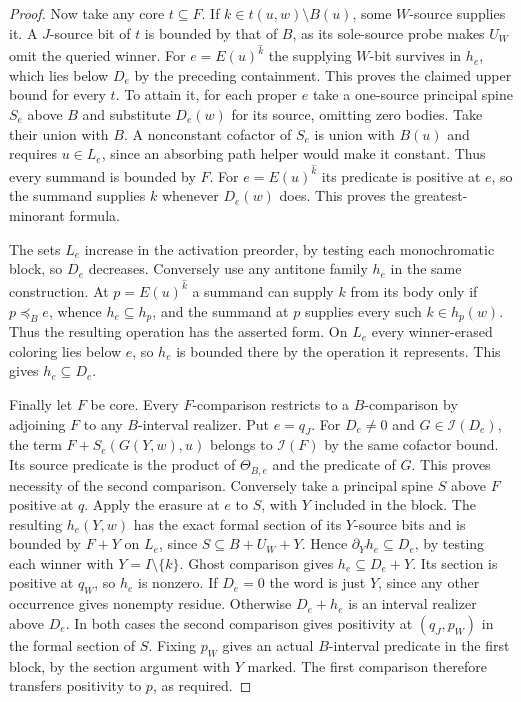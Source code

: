 \begin{proof}
Now take any core $t\subseteq F$. If $k\in t(u,w)\setminus B(u)$,
some $W$-source supplies it. A $J$-source bit of $t$ is bounded by
that of $B$, as its sole-source probe makes $U_W$ omit the queried
winner. For $e=E(u)^{\widehat k}$ the supplying $W$-bit survives in
$h_e$, which lies below $D_e$ by the preceding containment. This
proves the claimed upper bound for every $t$.
To attain it, for each proper $e$ take a one-source principal spine
$S_e$ above $B$ and substitute $D_e(w)$ for its source, omitting
zero bodies. Take their union with $B$. A nonconstant cofactor of
$S_e$ is union with $B(u)$ and requires $u\in L_e$, since an
absorbing path helper would make it constant. Thus every summand
is bounded by $F$. For $e=E(u)^{\widehat k}$ its predicate is
positive at $e$, so the summand supplies $k$ whenever $D_e(w)$ does.
This proves the greatest-minorant formula.

The sets $L_e$ increase in the activation preorder, by testing each
monochromatic block, so $D_e$ decreases. Conversely use any antitone
family $h_e$ in the same construction. At $p=E(u)^{\widehat k}$ a
summand can supply $k$ from its body only if $p\preceq_B e$, whence
$h_e\subseteq h_p$, and the summand at $p$ supplies every such
$k\in h_p(w)$. Thus the resulting operation has the asserted form.
On $L_e$ every winner-erased coloring lies below $e$, so $h_e$ is
bounded there by the operation it represents. This gives $h_e\subseteq D_e$.

Finally let $F$ be core. Every $F$-comparison restricts to a
$B$-comparison by adjoining $F$ to any $B$-interval realizer.
Put $e=q_J$. For $D_e\ne0$ and $G\in\mathcal I(D_e)$, the term
$F+S_e(G(Y,w),u)$ belongs to $\mathcal I(F)$ by the same cofactor
bound. Its source predicate is the product of $\Theta_{B,e}$ and
the predicate of $G$. This proves necessity of the second comparison.
Conversely take a principal spine $S$ above $F$ positive at $q$.
Apply the erasure at $e$ to $S$, with $Y$ included in the block.
The resulting $h_e(Y,w)$ has the exact formal section of its
$Y$-source bits and is bounded by $F+Y$ on $L_e$, since
$S\subseteq B+U_W+Y$. Hence $\partial_Y h_e\subseteq D_e$, by
testing each winner with $Y=I\setminus\{k\}$. Ghost comparison gives
$h_e\subseteq D_e+Y$. Its section is positive at $q_W$, so $h_e$
is nonzero. If $D_e=0$ the word is just $Y$, since any other
occurrence gives nonempty residue. Otherwise $D_e+h_e$ is an interval
realizer above $D_e$. In both cases the second comparison gives
positivity at $(q_J,p_W)$ in the formal section of $S$.
Fixing $p_W$ gives an actual $B$-interval predicate in the first
block, by the section argument with $Y$ marked. The first comparison
therefore transfers positivity to $p$, as required.
\end{proof}

